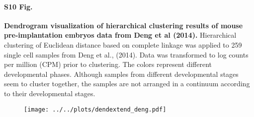 \documentclass[10pt,letterpaper]{article}
\begin{document}
\paragraph*{S10 Fig.}

\label{figS10}
{\bf Dendrogram visualization of hierarchical clustering results of mouse pre-implantation embryos data from Deng et al (2014).} Hierarchical clustering of Euclidean distance based on complete linkage was applied to 259 single cell samples from Deng et al., (2014). Data was transformed to log counts per million (CPM) prior to clustering. The colors represent different developmental phases. Although samples from different developmental stages seem to cluster together, the samples are not arranged in a continuum according to their developmental stages.
\begin{figure}[ht]
\centering
\texttt{[image: ../../plots/dendextend\_deng.pdf]}
\end{figure}
\end{document}
